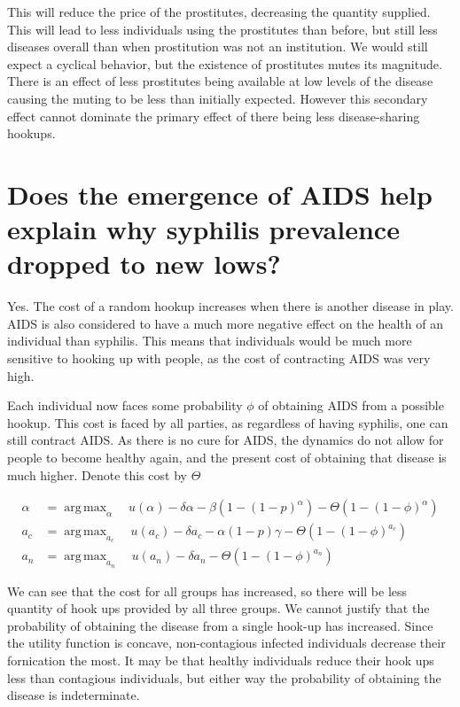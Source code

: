\documentclass[12pt]{paper}
\DeclareMathOperator*{\argmax}{arg\,max}
\begin{document}
This will reduce the price of the prostitutes, decreasing the quantity
supplied. This will lead to less individuals using the prostitutes
than before, but still less diseases overall than when prostitution
was not an institution. We would still expect a cyclical behavior, but
the existence of prostitutes mutes its magnitude. There is an effect
of less prostitutes being available at low levels of the disease
causing the muting to be less than initially expected. However this
secondary effect cannot dominate the primary effect of there being
less disease-sharing hookups.

\section*{Does the emergence of AIDS help explain why syphilis prevalence dropped to new lows?}

Yes. The cost of a random hookup increases when there is another
disease in play. AIDS is also considered to have a much more negative
effect on the health of an individual than syphilis. This means that
individuals would be much more sensitive to hooking up with people, as
the cost of contracting AIDS was very high.

Each individual now faces some probability $\phi$ of obtaining AIDS from
a possible hookup. This cost is faced by all parties, as regardless of
having syphilis, one can still contract AIDS. As there is no cure for
AIDS, the dynamics do not allow for people to become healthy again,
and the present cost of obtaining that disease is much higher.  Denote
this cost by $\Theta$

\begin{align*}
  \alpha &= \argmax_{\alpha} \quad u(\alpha) - \delta\alpha - \beta( 1 - (1-p)^{\alpha}) - \Theta ( 1 - (1-\phi)^{\alpha})\\
  a_c &= \argmax_{a_c} \quad u( a_c) - \delta a_c - \alpha ( 1 - p)\gamma - \Theta ( 1 - (1-\phi)^{a_c})\\
  a_n &= \argmax_{a_n} \quad u( a_n) - \delta a_n  - \Theta ( 1 - (1-\phi)^{a_n})
\end{align*}

We can see that the cost for all groups has increased, so there will
be less quantity of hook ups provided by all three groups. We cannot
justify that the probability of obtaining the disease from a single
hook-up has increased. Since the utility function is concave,
non-contagious infected individuals decrease their fornication the
most. It may be that healthy individuals reduce their hook ups less
than contagious individuals, but either way the probability of
obtaining the disease is indeterminate.
\end{document}
